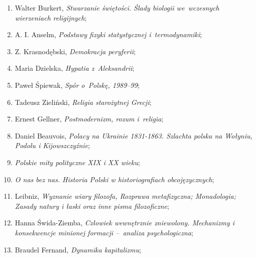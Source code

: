 \documentclass[a4paper,11pt]{article}
\begin{document}
\begin{enumerate}
\item Walter Burkert, \textit{Stwarzanie świętości. Ślady biologii
    we~wczesnych wierzeniach religijnych};



\item A. I. Anselm, \textit{Podstawy fizyki statystycznej
    i~termodynamiki};



\item Z. Krasnodębski, \textit{Demokracja peryferii};



\item Maria Dzielska, \textit{Hypatia z~Aleksandrii};



\item Paweł Śpiewak, \textit{Spór o~Polskę, 1989--99};



\item Tadeusz Zieliński, \textit{Religia starożytnej Grecji};



\item Ernest Gellner, \textit{Postmodernizm, rozum i~religia};



\item Daniel Beauvois, \textit{Polacy na Ukrainie 1831-1863. Szlachta
    polska na Wołyniu, Podolu i Kijowszczyźnie};



\item \textit{Polskie mity polityczne XIX i XX wieku};



\item \textit{O nas bez nas. Historia Polski w historiografiach
    obcojęzycznych};



\item Leibniz, \textit{Wyznanie wiary filozofa, Rozprawa metafizyczna;
    Monadologia; Zasady natury i łaski oraz inne pisma filozoficzne};



\item Hanna Świda-Ziemba, \textit{Człowiek wewnętrznie zniewolony.
    Mechanizmy i konsekwencje minionej formacji --~analiza
    psychologiczna};



\item Braudel Fernand, \textit{Dynamika kapitalizmu};




\end{enumerate}
\end{document}
